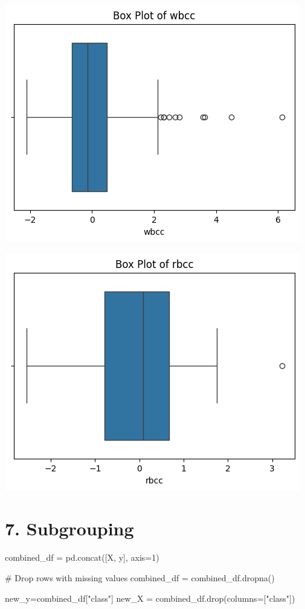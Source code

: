 \documentclass[
  11pt,
  letterpaper,
  DIV=11,
  numbers=noendperiod]{scrartcl}
\newenvironment{Shaded}{\begin{snugshade}}{\end{snugshade}}
\newcommand{\CommentTok}[1]{\textcolor[rgb]{0.37,0.37,0.37}{#1}}
\newcommand{\DecValTok}[1]{\textcolor[rgb]{0.68,0.00,0.00}{#1}}
\newcommand{\NormalTok}[1]{\textcolor[rgb]{0.00,0.23,0.31}{#1}}
\newcommand{\OperatorTok}[1]{\textcolor[rgb]{0.37,0.37,0.37}{#1}}
\newcommand{\StringTok}[1]{\textcolor[rgb]{0.13,0.47,0.30}{#1}}
\begin{document}
\includegraphics{Assignment6_Final version_files/figure-pdf/cell-18-output-11.png}

\includegraphics{Assignment6_Final version_files/figure-pdf/cell-18-output-12.png}

\section{7. Subgrouping}\label{subgrouping}

\begin{Shaded}
\begin{Highlighting}[]
\NormalTok{combined\_df }\OperatorTok{=}\NormalTok{ pd.concat([X, y], axis}\OperatorTok{=}\DecValTok{1}\NormalTok{)}

\CommentTok{\# Drop rows with missing values}
\NormalTok{combined\_df }\OperatorTok{=}\NormalTok{ combined\_df.dropna()}

\NormalTok{new\_y}\OperatorTok{=}\NormalTok{combined\_df[}\StringTok{"class"}\NormalTok{]}
\NormalTok{new\_X }\OperatorTok{=}\NormalTok{ combined\_df.drop(columns}\OperatorTok{=}\NormalTok{[}\StringTok{"class"}\NormalTok{])}
\end{Highlighting}
\end{Shaded}
\end{document}
